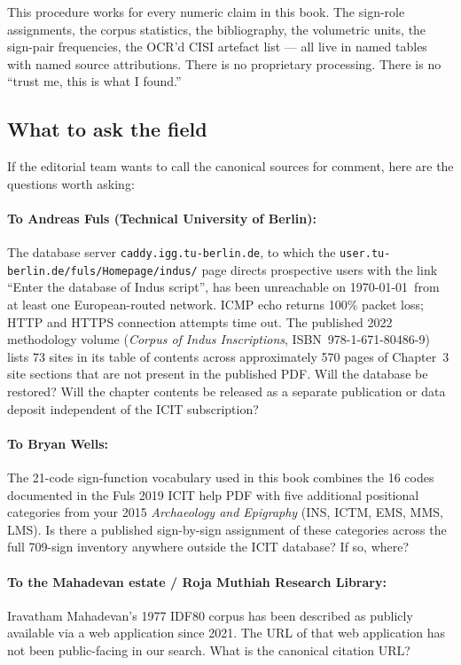 This procedure works for every numeric claim in this book. The
sign-role assignments, the corpus statistics, the bibliography,
the volumetric units, the sign-pair frequencies, the OCR'd CISI
artefact list --- all live in named tables with named source
attributions. There is no proprietary processing. There is no
``trust me, this is what I found.''

\subsection{What to ask the field}

If the editorial team wants to call the canonical sources for
comment, here are the questions worth asking:

\paragraph{To Andreas Fuls (Technical University of Berlin):}
The database server \texttt{caddy.igg.tu-berlin.de}, to which the
\texttt{user.tu-berlin.de/fuls/Homepage/indus/} page directs
prospective users with the link ``Enter the database of Indus
script'', has been unreachable on \today\ from at least one
European-routed network. ICMP echo returns 100\% packet loss; HTTP
and HTTPS connection attempts time out. The published 2022
methodology volume (\textit{Corpus of Indus Inscriptions},
ISBN~978-1-671-80486-9) lists 73 sites in its table of contents
across approximately 570 pages of Chapter~3 site sections that are
not present in the published PDF. Will the database be restored?
Will the chapter contents be released as a separate publication or
data deposit independent of the ICIT subscription?

\paragraph{To Bryan Wells:}
The 21-code sign-function vocabulary used in this book combines
the 16 codes documented in the Fuls 2019 ICIT help PDF with five
additional positional categories from your 2015 \textit{Archaeology
and Epigraphy} (INS, ICTM, EMS, MMS, LMS). Is there a published
sign-by-sign assignment of these categories across the full 709-sign
inventory anywhere outside the ICIT database? If so, where?

\paragraph{To the Mahadevan estate / Roja Muthiah Research Library:}
Iravatham Mahadevan's 1977 IDF80 corpus has been described as
publicly available via a web application since 2021. The URL of
that web application has not been public-facing in our search.
What is the canonical citation URL?

